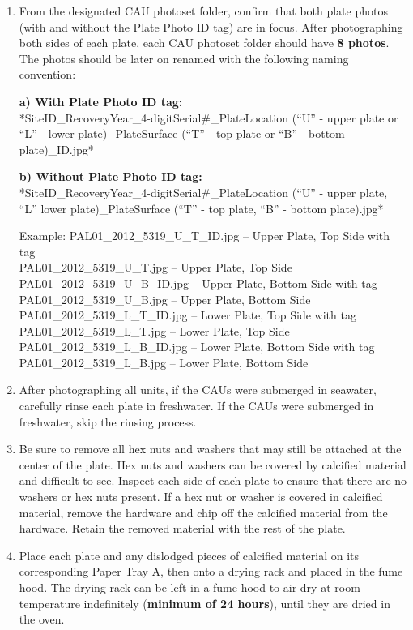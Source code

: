 \documentclass[]{book}
\begin{document}
\begin{enumerate}
\def\labelenumi{\arabic{enumi}.}
\setcounter{enumi}{8}
\item
  From the designated CAU photoset folder, confirm that both plate photos (with and without the Plate Photo ID tag) are in focus. After photographing both sides of each plate, each CAU photoset folder should have \textbf{8 photos}. The photos should be later on renamed with the following naming convention:

  \textbf{a) With Plate Photo ID tag:}\\
  *SiteID\_RecoveryYear\_4-digitSerial\#\_PlateLocation (``U'' - upper plate or ``L'' - lower plate)\_PlateSurface (``T'' - top plate or ``B'' - bottom plate)\_ID.jpg*

  \textbf{b) Without Plate Photo ID tag:}\\
  *SiteID\_RecoveryYear\_4-digitSerial\#\_PlateLocation (``U'' - upper plate, ``L'' lower plate)\_PlateSurface (``T'' - top plate, ``B'' - bottom plate).jpg*

  Example:
  PAL01\_2012\_5319\_U\_T\_ID.jpg -- Upper Plate, Top Side with tag\\
  PAL01\_2012\_5319\_U\_T.jpg -- Upper Plate, Top Side\\
  PAL01\_2012\_5319\_U\_B\_ID.jpg -- Upper Plate, Bottom Side with tag
  PAL01\_2012\_5319\_U\_B.jpg -- Upper Plate, Bottom Side\\
  PAL01\_2012\_5319\_L\_T\_ID.jpg -- Lower Plate, Top Side with tag\\
  PAL01\_2012\_5319\_L\_T.jpg -- Lower Plate, Top Side\\
  PAL01\_2012\_5319\_L\_B\_ID.jpg -- Lower Plate, Bottom Side with tag\\
  PAL01\_2012\_5319\_L\_B.jpg -- Lower Plate, Bottom Side
\item
  After photographing all units, if the CAUs were submerged in seawater, carefully rinse each plate in freshwater. If the CAUs were submerged in freshwater, skip the rinsing process.
\item
  Be sure to remove all hex nuts and washers that may still be attached at the center of the plate. Hex nuts and washers can be covered by calcified material and difficult to see. Inspect each side of each plate to ensure that there are no washers or hex nuts present. If a hex nut or washer is covered in calcified material, remove the hardware and chip off the calcified material from the hardware. Retain the removed material with the rest of the plate.
\item
  Place each plate and any dislodged pieces of calcified material on its corresponding Paper Tray A, then onto a drying rack and placed in the fume hood. The drying rack can be left in a fume hood to air dry at room temperature indefinitely (\textbf{minimum of 24 hours}), until they are dried in the oven.
\end{enumerate}
\end{document}
